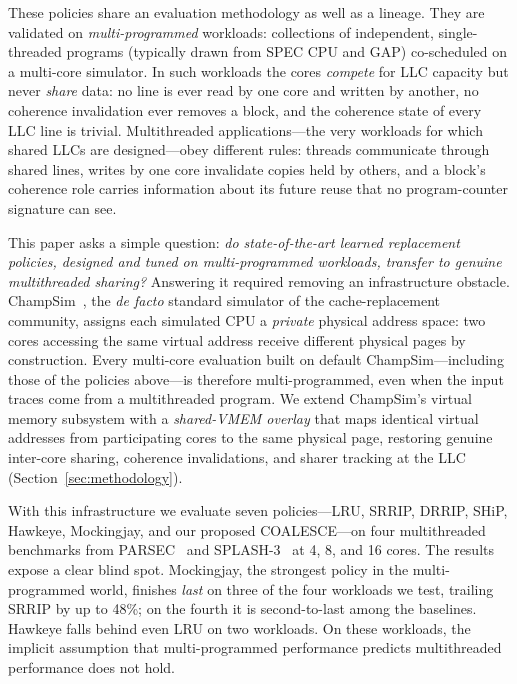 \documentclass[conference]{IEEEtran}
\begin{document}
These policies share an evaluation methodology as well as a lineage. They are validated on \emph{multi-programmed} workloads: collections of independent, single-threaded programs (typically drawn from SPEC CPU and GAP) co-scheduled on a multi-core simulator. In such workloads the cores \emph{compete} for LLC capacity but never \emph{share} data: no line is ever read by one core and written by another, no coherence invalidation ever removes a block, and the coherence state of every LLC line is trivial. Multithreaded applications---the very workloads for which shared LLCs are designed---obey different rules: threads communicate through shared lines, writes by one core invalidate copies held by others, and a block's coherence role carries information about its future reuse that no program-counter signature can see.

This paper asks a simple question: \emph{do state-of-the-art learned replacement policies, designed and tuned on multi-programmed workloads, transfer to genuine multithreaded sharing?} Answering it required removing an infrastructure obstacle. ChampSim~\cite{champsim2022}, the \emph{de facto} standard simulator of the cache-replacement community, assigns each simulated CPU a \emph{private} physical address space: two cores accessing the same virtual address receive different physical pages by construction. Every multi-core evaluation built on default ChampSim---including those of the policies above---is therefore multi-programmed, even when the input traces come from a multithreaded program. We extend ChampSim's virtual memory subsystem with a \emph{shared-VMEM overlay} that maps identical virtual addresses from participating cores to the same physical page, restoring genuine inter-core sharing, coherence invalidations, and sharer tracking at the LLC (Section~\ref{sec:methodology}).

With this infrastructure we evaluate seven policies---LRU, SRRIP, DRRIP, SHiP, Hawkeye, Mockingjay, and our proposed COALESCE---on four multithreaded benchmarks from PARSEC~\cite{bienia2008parsec} and SPLASH-3~\cite{sakalis2016splash3} at 4, 8, and 16 cores. The results expose a clear blind spot. Mockingjay, the strongest policy in the multi-programmed world, finishes \emph{last} on three of the four workloads we test, trailing SRRIP by up to 48\%; on the fourth it is second-to-last among the baselines. Hawkeye falls behind even LRU on two workloads. On these workloads, the implicit assumption that multi-programmed performance predicts multithreaded performance does not hold.
\end{document}
